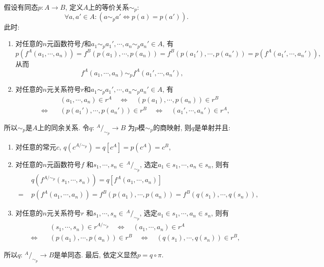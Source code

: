 \documentclass[UTF8]{ctexart}
\begin{document}
假设有同态$p:A\to B$, 定义$A$上的等价关系$\sim_p$:
\[
    \forall a,a'\in A:(a\sim_p a'\iff p(a)=p(a')).
\]
此时:
\begin{enumerate}
    \item 对任意的$n$元函数符号$f$和$a_1\sim_p a_1',\cdots,a_n\sim_p a_n'\in A$, 有
    \[
        p(f^A(a_1,\cdots,a_n))=f^B(p(a_1),\cdots,p(a_n))
        =f^B(p(a_1'),\cdots,p(a_n'))=p(f^A(a_1',\cdots,a_n')),
    \]
    从而
    \[
        f^A(a_1,\cdots,a_n)\sim_p f^A(a_1',\cdots,a_n'),
    \]
    \item 对任意的$n$元关系符号$r$和$a_1\sim_p a_1',\cdots,a_n\sim_p a_n'\in A$, 有
    \[\begin{aligned}
        &(a_1,\cdots,a_n)\in r^A\quad\iff\quad(p(a_1),\cdots,p(a_n))\in r^B\\[-3pt]
        \quad\iff\quad&(p(a_1'),\cdots,p(a_n'))\in r^B\quad\iff\quad
        (a_1',\cdots,a_n')\in r^A,
    \end{aligned}\]
\end{enumerate}
\vspace{3pt}
所以$\sim_p$是$A$上的同余关系. 令$q:\,^{\displaystyle A}\!/_{\displaystyle\sim_p}\to B$
为$p$模$\sim_p$的商映射, 则$q$是单射并且:
\begin{enumerate}
    \item 对任意的常元$c$, $q(c^{A/\sim_p})=q[c^A]=p(c^A)=c^B$,
    \vspace{3pt}
    \item 对任意的$n$元函数符号$f$
    和$s_1,\cdots,s_n\in\,\!^{\displaystyle A}\!/_{\displaystyle\sim_p}$,
    选定$a_1\in s_1,\cdots,a_n\in s_n$, 则有
    \[\begin{aligned}
        &q(f^{A/\sim_p}(s_1,\cdots,s_n))=q[f^A(a_1,\cdots,a_n)]\\[-3pt]
        =\,\,&p(f^A(a_1,\cdots,a_n))=f^B(p(a_1),\cdots,p(a_n))
        =f^B(q(s_1),\cdots,q(s_n)),
    \end{aligned}\]
    \item 对任意的$n$元关系符号$r$
    和$s_1,\cdots,s_n\in\,\!^{\displaystyle A}\!/_{\displaystyle\sim_p}$,
    选定$a_1\in s_1,\cdots,a_n\in s_n$, 则有
    \[\begin{aligned}
        &(s_1,\cdots,s_n)\in r^{A/\sim_p}\quad\iff\quad
        (a_1,\cdots,a_n)\in r^A\\[-3pt]\quad\iff\quad&
        (p(a_1),\cdots,p(a_n))\in r^B\quad\iff\quad
        (q(s_1),\cdots,q(s_n))\in r^B,
    \end{aligned}\]
\end{enumerate}
所以$q:\,^{\displaystyle A}\!/_{\displaystyle\sim_p}\to B$是单同态.
最后, 依定义显然$p=q\circ\pi$.
\end{document}
